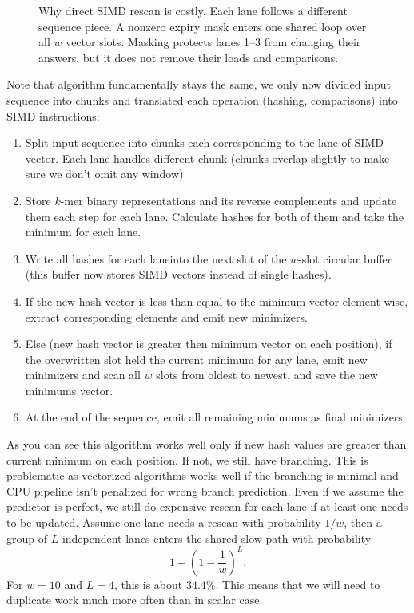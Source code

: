 \begin{figure}[H]
\begin{tikzpicture}
\end{tikzpicture}
\caption{Why direct SIMD rescan is costly. Each lane follows a different
sequence piece. A nonzero expiry mask enters one shared loop over all $w$
vector slots. Masking protects lanes 1--3 from changing their answers, but it
does not remove their loads and comparisons.}
\label{fig:rewrite-naive-simd-rescan}
\end{figure}

Note that algorithm fundamentally stays the same, we only now divided input sequence into chunks and translated each operation (hashing, comparisons) into SIMD instructions:

\begin{algorithm}[H]
\caption{Naive SIMDified minimap2 rescan algorithm}
\label{alg:simd-minimap-rescan}
\small
\begin{enumerate}
  \item Split input sequence into chunks each corresponding to the lane of SIMD vector. Each lane handles different chunk (chunks overlap slightly to make sure we don't omit any window)
  \item Store $k$-mer binary representations and its reverse complements and update them each step for each lane. Calculate hashes for both of them and take the minimum for each lane.
  \item Write all hashes for each laneinto the next slot of the $w$-slot circular buffer (this buffer now stores SIMD vectors instead of single hashes).
  \item If the new hash vector is less than equal to the minimum vector element-wise, extract corresponding elements and emit new minimizers.
  \item Else (new hash vector is greater then minimum vector on each position), if the overwritten slot held the current minimum for any lane, emit new minimizers and scan all $w$ slots from oldest to newest, and save the
        new minimums vector.
  \item At the end of the sequence, emit all remaining minimums as final minimizers.
\end{enumerate}
\end{algorithm}

As you can see this algorithm works well only if new hash values are greater than current minimum on each position. If not, we still have branching. This is problematic as vectorized algorithms works well if the branching is minimal and CPU pipeline isn't penalized for wrong branch prediction.
Even if we assume the predictor is perfect, we still do expensive rescan for each lane if at least one needs to be updated. Assume one lane needs a rescan with probability $1/w$, then a group of $L$
independent lanes enters the shared slow path with probability
\[
  1-\left(1-\frac1w\right)^L.
\]
For $w=10$ and $L=4$, this is about $34.4\%$. This means that we will need to duplicate work much more often than in scalar case.

